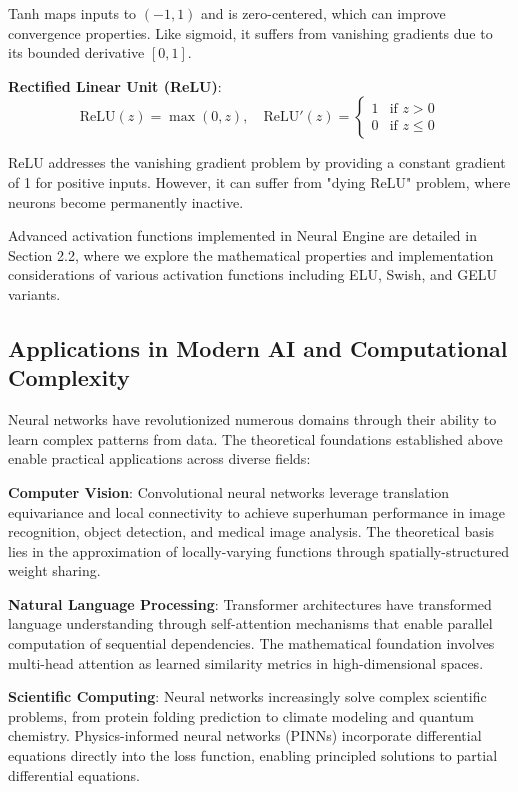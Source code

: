 \documentclass[11pt,a4paper]{report}
\begin{document}
Tanh maps inputs to $(-1, 1)$ and is zero-centered, which can improve convergence properties. Like sigmoid, it suffers from vanishing gradients due to its bounded derivative $[0, 1]$.

\textbf{Rectified Linear Unit (ReLU)}:
\begin{equation}
\text{ReLU}(z) = \max(0, z), \quad \text{ReLU}'(z) = \begin{cases} 1 & \text{if } z > 0 \\ 0 & \text{if } z \leq 0 \end{cases}
\end{equation}

ReLU addresses the vanishing gradient problem by providing a constant gradient of 1 for positive inputs. However, it can suffer from "dying ReLU" problem, where neurons become permanently inactive.

Advanced activation functions implemented in Neural Engine are detailed in Section 2.2, where we explore the mathematical properties and implementation considerations of various activation functions including ELU, Swish, and GELU variants.

\subsection{Applications in Modern AI and Computational Complexity}

Neural networks have revolutionized numerous domains through their ability to learn complex patterns from data. The theoretical foundations established above enable practical applications across diverse fields:

\textbf{Computer Vision}: Convolutional neural networks leverage translation equivariance and local connectivity to achieve superhuman performance in image recognition, object detection, and medical image analysis. The theoretical basis lies in the approximation of locally-varying functions through spatially-structured weight sharing.

\textbf{Natural Language Processing}: Transformer architectures have transformed language understanding through self-attention mechanisms that enable parallel computation of sequential dependencies. The mathematical foundation involves multi-head attention as learned similarity metrics in high-dimensional spaces.

\textbf{Scientific Computing}: Neural networks increasingly solve complex scientific problems, from protein folding prediction to climate modeling and quantum chemistry. Physics-informed neural networks (PINNs) incorporate differential equations directly into the loss function, enabling principled solutions to partial differential equations.
\end{document}
